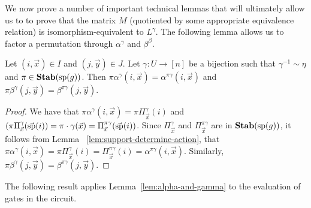 \documentclass[../paper.tex]{subfiles}
\begin{document}


We now prove a number of important technical lemmas that will ultimately allow
us to to prove that the matrix $M$ (quotiented by some appropriate equivalence
relation) is isomorphism-equivalent to $L^{\gamma}$. The following lemma
allows us to factor a permutation through $\alpha^{\gamma}$ and $\beta^{\beta}$.

\begin{lem}
\label{lem:alpha-and-gamma}
	Let $(i,\vec{x}) \in I$ and $(j, \vec{y}) \in J$. Let $\gamma: U \rightarrow
	[n]$ be a bijection such that $\gamma^{-1} \sim \eta$ and $\pi \in \text{\textbf{Stab}} (\text{sp} (g))$.
	Then $\pi \alpha^{\gamma}(i, \vec{x}) = \alpha^{\pi \gamma}(i, \vec{x})$ and
	$\pi \beta^{\gamma}(j, \vec{y}) = \beta^{\pi \gamma}(j, \vec{y})$.
\end{lem}
\begin{proof}
	We have that $\pi \alpha^{\gamma}(i, \vec{x}) = \pi \Pi^{\gamma}_{\vec{x}}(i)$
	and $(\pi \Pi^{\gamma}_{\vec{x}}(\vec{\text{sp}}(i)) = \pi \cdot \gamma (\vec{x})
	= \Pi^{\pi \gamma}_{\vec{x}}(\vec{\text{sp}}(i))$. Since $\Pi^{\gamma}_{\vec{x}}$
	and $\Pi^{\pi \gamma}_{\vec{x}}$ are in $\text{\textbf{Stab}} (\text{sp} (g))$, it follows from Lemma
	~\ref{lem:support-determine-action}, that $\pi \alpha^{\gamma}(i, \vec{x}) =
	\pi \Pi^{\gamma}_{\vec{x}} (i) = \Pi^{\pi \gamma}_{\vec{x}}(i) = \alpha^{\pi
		\gamma}(i, \vec{x})$. Similarly, $\pi \beta^{\gamma}(j, \vec{y}) =
	\beta^{\pi \gamma} (j, \vec{y})$.
\end{proof}

The following result applies Lemma~\ref{lem:alpha-and-gamma} to the evaluation
of gates in the circuit.
\end{document}
